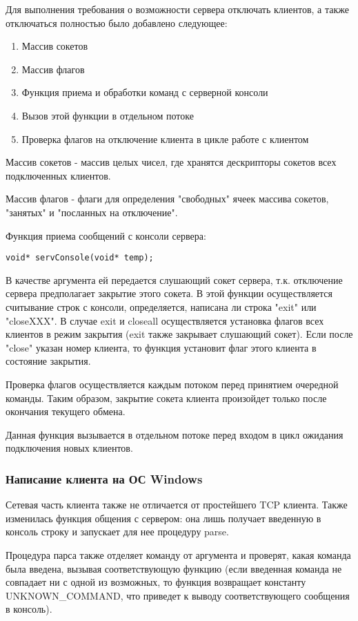 Для выполнения требования о возможности сервера отключать клиентов, а также отключаться полностью было добавлено следующее:
\begin{enumerate}
\item Массив сокетов
\item Массив флагов
\item Функция приема и обработки команд с серверной консоли
\item Вызов этой функции в отдельном потоке
\item Проверка флагов на отключение клиента в цикле работе с клиентом
\end{enumerate}

Массив сокетов - массив целых чисел, где хранятся дескрипторы сокетов всех подключенных клиентов.

Массив флагов - флаги для определения "свободных" ячеек массива сокетов, "занятых" и "посланных на отключение".

Функция приема сообщений с консоли сервера:
\begin{lstlisting}
void* servConsole(void* temp);
\end{lstlisting}
В качестве аргумента ей передается слушающий сокет сервера, т.к. отключение сервера предполагает закрытие этого сокета.
В этой функции осуществляется считывание строк с консоли, определяется, написана ли строка "exit" или "closeXXX". В случае exit и closeall осуществляется установка флагов всех клиентов в режим закрытия (exit также закрывает слушающий сокет). Если после "close" указан номер клиента, то функция установит флаг этого клиента в состояние закрытия.

Проверка флагов осуществляется каждым потоком перед принятием очередной команды. Таким образом, закрытие сокета клиента произойдет только после окончания текущего обмена.

Данная функция вызывается в отдельном потоке перед входом в цикл ожидания подключения новых клиентов.

\subsubsection{Написание клиента на ОС Windows}
Сетевая часть клиента также не отличается от простейшего TCP клиента. 
Также изменилась функция общения с сервером: она лишь получает введенную в консоль строку и запускает для нее процедуру parse.

Процедура парса также отделяет команду от аргумента и проверят, какая команда была введена, вызывая соответствующую функцию (если введенная команда не совпадает ни с одной из возможных, то функция возвращает константу UNKNOWN\_COMMAND, что приведет к выводу соответствующего сообщения в консоль).

